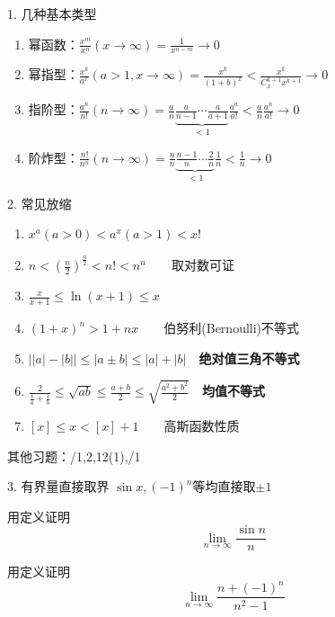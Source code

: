 \documentclass[UTF8]{ctexbeamer}
\begin{document}
\begin{frame}{1. 几种基本类型}
\begin{enumerate}
	\item 幂函数：$\displaystyle\frac{x^m}{x^n}(x\to\infty)=\frac{1}{x^{n-m}}\to 0$
	\item 幂指型：$\displaystyle\frac{x^k}{a^x}(a>1,x\to\infty)=\frac{x^k}{(1+b)^x}<\frac{x^k}{C_x^{k+1}x^{k+1}}\to 0$
	\item 指阶型：$\displaystyle\frac{a^n}{n!}(n\to\infty)=\frac{a}{n}\underbrace{\frac{a}{n-1}\cdots\frac{a}{a+1}}_{<1}\frac{a^a}{a!}<\frac{a}{n}\frac{a^n}{a!}\to 0$
	\item 阶炸型：$\displaystyle\frac{n!}{n^n}(n\to\infty)=\frac{n}{n}\underbrace{\frac{n-1}{n}\cdots\frac{2}{n}}_{<1}\frac{1}{n}<\frac{1}{n}\to 0$
\end{enumerate}
\end{frame}

\begin{frame}{2. 常见放缩}
\begin{enumerate}
	\item $x^a(a>0)<a^x(a>1)<x!$
	\item $\displaystyle n<\left(\frac{n}{2}\right)^{\frac{n}{2}}<n!<n^n\qquad$取对数可证
	\item $\displaystyle \frac{x}{x+1}\leq\ln(x+1)\leq x$
	\item $\displaystyle (1+x)^n>1+nx\qquad$伯努利(Bernoulli)不等式
	\item $\Big||a|-|b|\Big|\leq|a\pm b|\leq|a|+|b|\quad$\textbf{绝对值三角不等式}
	\item $\displaystyle \frac{2}{\frac{1}{a}+\frac{1}{b}}\leq\sqrt{ab}\leq\frac{a+b}{2}\leq\sqrt{\frac{a^2+b^2}{2}}\quad$\textbf{均值不等式}
	\item $[x]\leq x<[x]+1\qquad$高斯函数性质
\end{enumerate}
其他习题：/1,2,12(1),/1
\end{frame}

\begin{frame}{3. 有界量直接取界}
$\sin x,(-1)^n$等均直接取$\pm 1$
\begin{example}[\textsection 3.2/1(2)]
用定义证明
\[\lim_{n\to\infty}\frac{\sin n}{n}\]
\end{example}
\begin{example}[\textsection 3.2/1(4)]
用定义证明
\[\lim_{n\to\infty}\frac{n+(-1)^n}{n^2-1}\]
\end{example}
\end{frame}
\end{document}
